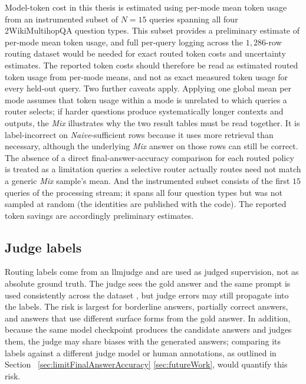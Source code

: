 \documentclass[english, bibtex]{kththesis}               %
\numberwithin{listing}{chapter}
\providecommand{\DIFaddtex}[1]{{\protect\color{blue} \sf #1}} %
\providecommand{\DIFdeltex}[1]{{\protect\color{red} \scriptsize #1}} %
\providecommand{\DIFaddbegin}{} %
\providecommand{\DIFaddend}{} %
\providecommand{\DIFdelbegin}{} %
\providecommand{\DIFdelend}{} %
\providecommand{\DIFadd}[1]{\texorpdfstring{\DIFaddtex{#1}}{#1}} %
\providecommand{\DIFdel}[1]{\texorpdfstring{\DIFdeltex{#1}}{}} %
\begin{document}
\DIFadd{Model-token cost in this thesis is estimated using per-mode mean token usage from an instrumented subset of \(N = 15\) queries spanning all four 2WikiMultihopQA question types. This subset provides a preliminary estimate of per-mode mean token usage, and full per-query logging across the $1{,}286$-row routing dataset would be needed for exact routed token costs and uncertainty estimates. The reported token costs should therefore be read as estimated routed token usage from per-mode means, and not as exact measured token usage for every held-out query. Two further caveats apply. Applying one global mean per mode assumes that token usage within a mode is unrelated to which queries a router selects; if harder questions produce systematically longer contexts and outputs, the }\DIFaddend \emph{Mix} \DIFdelbegin \DIFdel{illustrates why the two result tables must be read together. It is label-incorrect on \emph{Naive}-sufficient rows because it uses more retrieval than necessary, although the underlying \emph{Mix} answer on those rows can still be correct. The absence of a direct final-answer-accuracy comparison for each routed policy is treated as a limitation }\DIFdelend \DIFaddbegin \DIFadd{queries a selective router actually routes need not match a generic \emph{Mix} sample's mean. And the instrumented subset consists of the first $15$ queries of the processing stream; it spans all four question types but was not sampled at random (the identities are published with the code). The reported token savings are accordingly preliminary estimates.
}

\subsection{Judge labels}
\label{sec:limitJudgeLabels}

\DIFadd{Routing labels come from an \gls{llmjudge} and are used as judged supervision, not as absolute ground truth. The judge sees the gold answer and the same prompt is used consistently across the dataset \cite{zheng2023judge}, but judge errors may still propagate into the labels. The risk is largest for borderline answers, partially correct answers, and answers that use different surface forms from the gold answer. In addition, because the same model checkpoint produces the candidate answers and judges them, the judge may share biases with the generated answers; comparing its labels against a different judge model or human annotations, as outlined }\DIFaddend in Section~\DIFdelbegin \DIFdel{\ref{sec:limitFinalAnswerAccuracy}}\DIFdelend \DIFaddbegin \DIFadd{\ref{sec:futureWork}, would quantify this risk}\DIFaddend .
\end{document}
